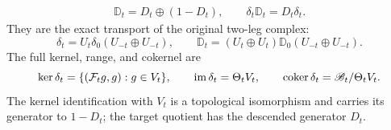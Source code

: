 \begin{proposition}
\begin{equation}
\begin{gathered}
 \mathbb D_t=D_t\oplus(1-D_t),
 \qquad\delta_t\mathbb D_t=D_t\delta_t.
 \end{gathered}
\end{equation}
They are the exact transport of the original two-leg complex:
\begin{equation}\label{wt:eq:two-leg-conjugacy}
 \delta_t=U_t\delta_0(U_{-t}\oplus U_{-t}),\qquad
 \mathbb D_t=(U_t\oplus U_t)\mathbb D_0
                         (U_{-t}\oplus U_{-t}).
\end{equation}
The full kernel, range, and cokernel are
\begin{equation}\label{wt:eq:two-leg-kernel}
 \ker\delta_t=\{(\mathcal F_tg,g):g\in V_t\},\qquad
 \operatorname{im}\delta_t=\Theta_tV_t,\qquad
 \operatorname{coker}\delta_t=\mathscr B_t/\Theta_tV_t.
\end{equation}
The kernel identification with $V_t$ is a topological isomorphism
and carries its generator to $1-D_t$; the target quotient has
the descended generator $D_t$.
\end{proposition}

